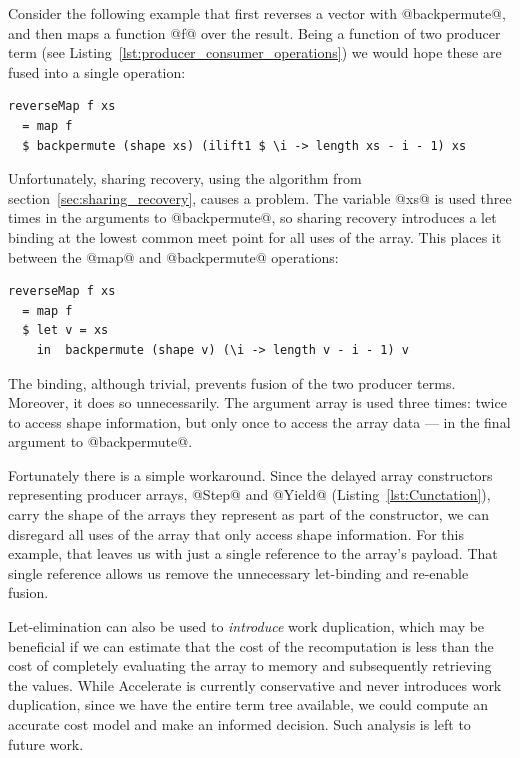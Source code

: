 Consider the following example that first reverses a vector with @backpermute@,
and then maps a function @f@ over the result. Being a function of two producer
term (see Listing~\ref{lst:producer_consumer_operations}) we would hope these
are fused into a single operation:%
%
\begin{lstlisting}[style=haskell]
reverseMap f xs
  = map f
  $ backpermute (shape xs) (ilift1 $ \i -> length xs - i - 1) xs
\end{lstlisting}
%
Unfortunately, sharing recovery, using the algorithm from
section~\ref{sec:sharing_recovery}, causes a problem. The variable @xs@
is used three times in the arguments to @backpermute@, so sharing recovery
introduces a let binding at the lowest common meet point for all uses of the
array. This places it between the @map@ and @backpermute@ operations:
%
\begin{lstlisting}[style=haskell]
reverseMap f xs
  = map f
  $ let v = xs
    in  backpermute (shape v) (\i -> length v - i - 1) v
\end{lstlisting}
%
The binding, although trivial, prevents fusion of the two producer terms.
Moreover, it does so unnecessarily. The argument array is used three times:
twice to access shape information, but only once to access the array data ---
in the final argument to @backpermute@.

Fortunately there is a simple workaround. Since the delayed array constructors
representing producer arrays, @Step@ and @Yield@ (Listing~\ref{lst:Cunctation}),
carry the shape of the arrays they represent as part of the constructor, we can
disregard all uses of the array that only access shape information. For this
example, that leaves us with just a single reference to the array's payload.
That single reference allows us remove the unnecessary let-binding and re-enable
fusion.

Let-elimination can also be used to \emph{introduce} work duplication, which may
be beneficial if we can estimate that the cost of the recomputation is less than
the cost of completely evaluating the array to memory and subsequently
retrieving the values. While Accelerate is currently conservative and never
introduces work duplication, since we have the entire term tree available, we
could compute an accurate cost model and make an informed decision. Such
analysis is left to future work.


